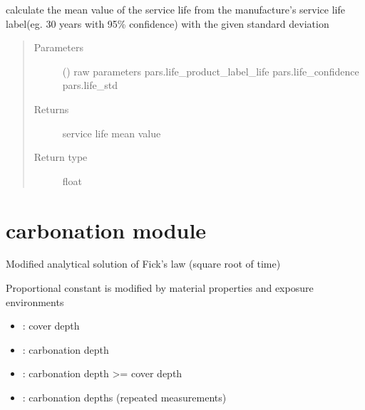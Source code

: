 \documentclass[letterpaper,10pt,english]{sphinxmanual}
\begin{document}

\begin{fulllineitems}
\label{\detokenize{membrane:membrane.membrane_life}}
\sphinxAtStartPar
calculate the mean value of the service life from the manufacture’s service life label(eg. 30 years with 95\% confidence)
with the given standard deviation
\begin{quote}\begin{description}
\item[{Parameters}] \leavevmode
\sphinxAtStartPar
{} () \textendash{} raw parameters
pars.life\_product\_label\_life
pars.life\_confidence
pars.life\_std

\item[{Returns}] \leavevmode
\sphinxAtStartPar
service life mean value

\item[{Return type}] \leavevmode
\sphinxAtStartPar
float

\end{description}\end{quote}

\end{fulllineitems}



\section{carbonation module}
\label{\detokenize{carbonation:module-carbonation}}\label{\detokenize{carbonation:carbonation-module}}\label{\detokenize{carbonation::doc}}
\sphinxAtStartPar
{}

\sphinxAtStartPar
Modified analytical solution of Fick’s law (square root of time)

\sphinxAtStartPar
Proportional constant is modified by material properties and exposure environments
\begin{itemize}
\item {} 
\sphinxAtStartPar
{}:       cover depth

\item {} 
\sphinxAtStartPar
{}:             carbonation depth

\item {} 
\sphinxAtStartPar
{}:      carbonation depth \textgreater{}= cover depth

\item {} 
\sphinxAtStartPar
{}:       carbonation depths (repeated measurements)

\end{itemize}
\end{document}
